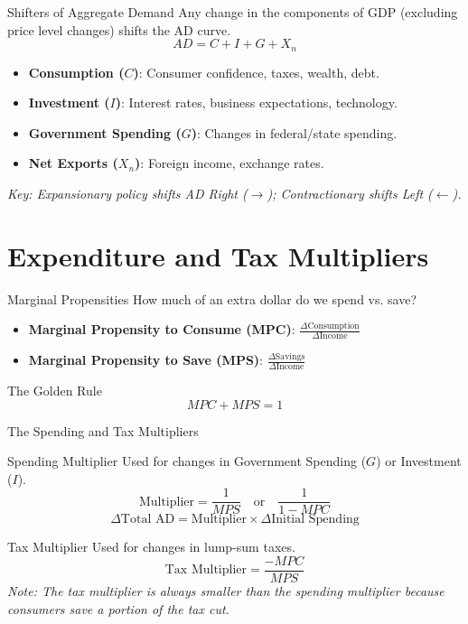 \documentclass{beamer}
\begin{document}
\begin{frame}{Shifters of Aggregate Demand}
    Any change in the components of GDP (excluding price level changes) shifts the AD curve.
    \[ AD = C + I + G + X_n \]
    \begin{itemize}
        \item \textbf{Consumption ($C$)}: Consumer confidence, taxes, wealth, debt.
        \item \textbf{Investment ($I$)}: Interest rates, business expectations, technology.
        \item \textbf{Government Spending ($G$)}: Changes in federal/state spending.
        \item \textbf{Net Exports ($X_n$)}: Foreign income, exchange rates.
    \end{itemize}
    \vspace{0.5cm}
    \textit{Key: Expansionary policy shifts AD Right ($\rightarrow$); Contractionary shifts Left ($\leftarrow$).}
\end{frame}

\section{Expenditure and Tax Multipliers}

\begin{frame}{Marginal Propensities}
    How much of an extra dollar do we spend vs. save?
    \begin{itemize}
        \item \textbf{Marginal Propensity to Consume (MPC)}: $\frac{\Delta \text{Consumption}}{\Delta \text{Income}}$
        \item \textbf{Marginal Propensity to Save (MPS)}: $\frac{\Delta \text{Savings}}{\Delta \text{Income}}$
    \end{itemize}
    \begin{block}{The Golden Rule}
        \[ MPC + MPS = 1 \]
    \end{block}
\end{frame}

\begin{frame}{The Spending and Tax Multipliers}
    \begin{block}{Spending Multiplier}
        Used for changes in Government Spending ($G$) or Investment ($I$).
        \[ \text{Multiplier} = \frac{1}{MPS} \quad \text{or} \quad \frac{1}{1 - MPC} \]
        \[ \Delta \text{Total AD} = \text{Multiplier} \times \Delta \text{Initial Spending} \]
    \end{block}

    \begin{block}{Tax Multiplier}
        Used for changes in lump-sum taxes.
        \[ \text{Tax Multiplier} = \frac{-MPC}{MPS} \]
        \textit{Note: The tax multiplier is always smaller than the spending multiplier because consumers save a portion of the tax cut.}
    \end{block}
\end{frame}
\end{document}
